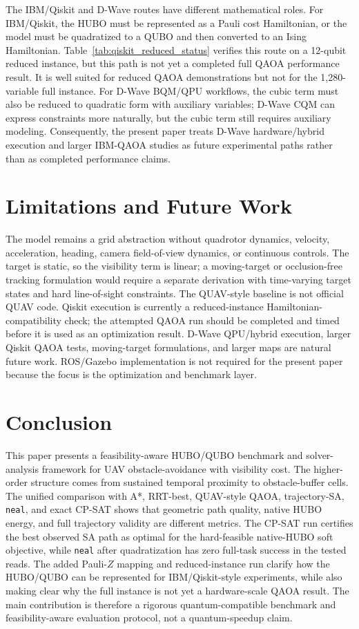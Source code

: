 \documentclass[10pt,conference]{IEEEtran}
\begin{document}
The IBM/Qiskit and D-Wave routes have different mathematical roles. For IBM/Qiskit, the HUBO must be represented as a Pauli cost Hamiltonian, or the model must be quadratized to a QUBO and then converted to an Ising Hamiltonian. Table~\ref{tab:qiskit_reduced_status} verifies this route on a 12-qubit reduced instance, but this path is not yet a completed full QAOA performance result. It is well suited for reduced QAOA demonstrations but not for the 1,280-variable full instance. For D-Wave BQM/QPU workflows, the cubic term must also be reduced to quadratic form with auxiliary variables; D-Wave CQM can express constraints more naturally, but the cubic term still requires auxiliary modeling. Consequently, the present paper treats D-Wave hardware/hybrid execution and larger IBM-QAOA studies as future experimental paths rather than as completed performance claims.

\section{Limitations and Future Work}
The model remains a grid abstraction without quadrotor dynamics, velocity, acceleration, heading, camera field-of-view dynamics, or continuous controls. The target is static, so the visibility term is linear; a moving-target or occlusion-free tracking formulation would require a separate derivation with time-varying target states and hard line-of-sight constraints. The QUAV-style baseline is not official QUAV code. Qiskit execution is currently a reduced-instance Hamiltonian-compatibility check; the attempted QAOA run should be completed and timed before it is used as an optimization result. D-Wave QPU/hybrid execution, larger Qiskit QAOA tests, moving-target formulations, and larger maps are natural future work. ROS/Gazebo implementation is not required for the present paper because the focus is the optimization and benchmark layer.

\section{Conclusion}
This paper presents a feasibility-aware HUBO/QUBO benchmark and solver-analysis framework for UAV obstacle-avoidance with visibility cost. The higher-order structure comes from sustained temporal proximity to obstacle-buffer cells. The unified comparison with A*, RRT-best, QUAV-style QAOA, trajectory-SA, \texttt{neal}, and exact CP-SAT shows that geometric path quality, native HUBO energy, and full trajectory validity are different metrics. The CP-SAT run certifies the best observed SA path as optimal for the hard-feasible native-HUBO soft objective, while \texttt{neal} after quadratization has zero full-task success in the tested reads. The added Pauli-$Z$ mapping and reduced-instance run clarify how the HUBO/QUBO can be represented for IBM/Qiskit-style experiments, while also making clear why the full instance is not yet a hardware-scale QAOA result. The main contribution is therefore a rigorous quantum-compatible benchmark and feasibility-aware evaluation protocol, not a quantum-speedup claim.
\end{document}
